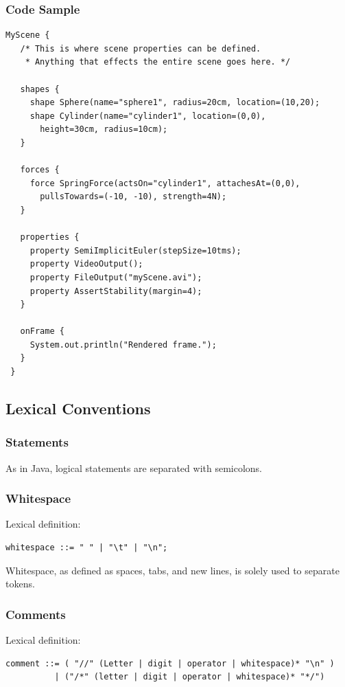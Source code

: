 \subsubsection{Code Sample}

\begin{verbatim}
MyScene {
   /* This is where scene properties can be defined.
    * Anything that effects the entire scene goes here. */
   
   shapes {
     shape Sphere(name="sphere1", radius=20cm, location=(10,20);
     shape Cylinder(name="cylinder1", location=(0,0), 
       height=30cm, radius=10cm);
   }
   
   forces {
     force SpringForce(actsOn="cylinder1", attachesAt=(0,0), 
       pullsTowards=(-10, -10), strength=4N);
   }
   
   properties {
     property SemiImplicitEuler(stepSize=10tms);
     property VideoOutput();
     property FileOutput("myScene.avi");
     property AssertStability(margin=4);
   }

   onFrame {
     System.out.println("Rendered frame.");
   }
 }
\end{verbatim}

\subsection{Lexical Conventions}
 
\subsubsection{Statements}
As in Java, logical statements are separated with semicolons.
 
\subsubsection{Whitespace}
Lexical definition:

\begin{verbatim}
whitespace ::= " " | "\t" | "\n";
\end{verbatim}

Whitespace, as defined as spaces, tabs, and new lines, is solely used
to separate tokens.
 
\subsubsection{Comments}
Lexical definition:

\begin{verbatim}
comment ::= ( "//" (Letter | digit | operator | whitespace)* "\n" ) 
          | ("/*" (letter | digit | operator | whitespace)* "*/")
\end{verbatim}


